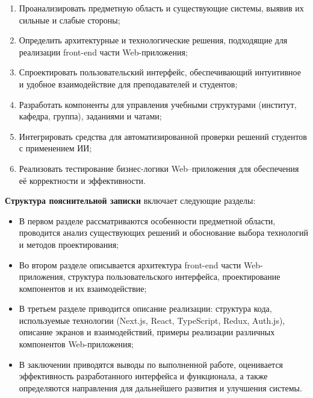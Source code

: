 \begin{enumerate}
  \item Проанализировать предметную область и существующие системы, выявив их сильные и слабые стороны;
  \item Определить архитектурные и технологические решения, подходящие для реализации front-end части Web-приложения;
  \item Спроектировать пользовательский интерфейс, обеспечивающий интуитивное и удобное взаимодействие для преподавателей и студентов;
  \item Разработать компоненты для управления учебными структурами (институт, кафедра, группа), заданиями и чатами;
  \item Интегрировать средства для автоматизированной проверки решений студентов с применением ИИ;
  \item Реализовать тестирование бизнес-логики Web–приложения для обеспечения её корректности и эффективности.
\end{enumerate}

\textbf{Структура пояснительной записки} включает следующие разделы:
\begin{itemize}
  \item В первом разделе рассматриваются особенности предметной области, проводится анализ существующих решений и обоснование выбора технологий и методов проектирования;
  \item Во втором разделе описывается архитектура front-end части Web-приложения, структура пользовательского интерфейса, проектирование компонентов и их взаимодействие;
  \item В третьем разделе приводится описание реализации: структура кода, используемые технологии (Next.js, React, TypeScript, Redux, Auth.js), описание экранов и взаимодействий, примеры реализации различных компонентов Web-приложения;
  \item В заключении приводятся выводы по выполненной работе, оценивается эффективность разработанного интерфейса и функционала, а также определяются направления для дальнейшего развития и улучшения системы.
\end{itemize}
